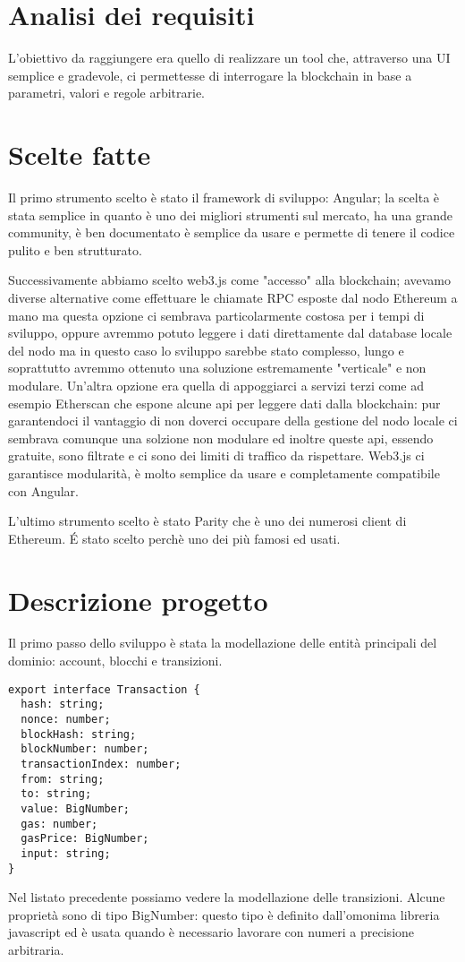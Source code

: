 \section{Analisi dei requisiti}
L'obiettivo da raggiungere era quello di realizzare un tool che, attraverso una UI semplice e gradevole, ci permettesse di interrogare la blockchain in base a parametri, valori e regole arbitrarie.

\section{Scelte fatte}

Il primo strumento scelto è stato il framework di sviluppo: Angular;
la scelta è stata semplice in quanto è uno dei migliori strumenti sul mercato, ha una grande community, è ben documentato è semplice da usare e permette di tenere il codice pulito e ben strutturato.

\vspace{0.5cm}

Successivamente abbiamo scelto web3.js come "accesso" alla blockchain;
avevamo diverse alternative come effettuare le chiamate RPC esposte dal nodo Ethereum a mano ma questa opzione ci sembrava particolarmente costosa per i tempi di sviluppo,
oppure avremmo potuto leggere i dati direttamente dal database locale del nodo ma in questo caso lo sviluppo sarebbe stato complesso, lungo e soprattutto avremmo ottenuto una soluzione estremamente "verticale" e non modulare.
Un'altra opzione era quella di appoggiarci a servizi terzi come ad esempio Etherscan che espone alcune api per leggere dati dalla blockchain:
pur garantendoci il vantaggio di non doverci occupare della gestione del nodo locale ci sembrava comunque una solzione non modulare ed inoltre queste api, essendo gratuite, sono filtrate e ci sono dei limiti di traffico da rispettare.
Web3.js ci garantisce modularità, è molto semplice da usare e completamente compatibile con Angular.

\vspace{0.5cm}

L'ultimo strumento scelto è stato Parity che è uno dei numerosi client di Ethereum. \'E stato scelto perchè uno dei più famosi ed usati.

\section{Descrizione progetto}
Il primo passo dello sviluppo è stata la modellazione delle entità principali del dominio: account, blocchi e transizioni.
\begin{lstlisting}
export interface Transaction {
  hash: string;
  nonce: number;
  blockHash: string;
  blockNumber: number;
  transactionIndex: number;
  from: string;
  to: string;
  value: BigNumber;
  gas: number;
  gasPrice: BigNumber;
  input: string;
}
\end{lstlisting}
Nel listato precedente possiamo vedere la modellazione delle transizioni.
Alcune proprietà sono di tipo BigNumber: questo tipo è definito dall'omonima libreria javascript ed è usata quando è necessario lavorare con numeri a precisione arbitraria.

